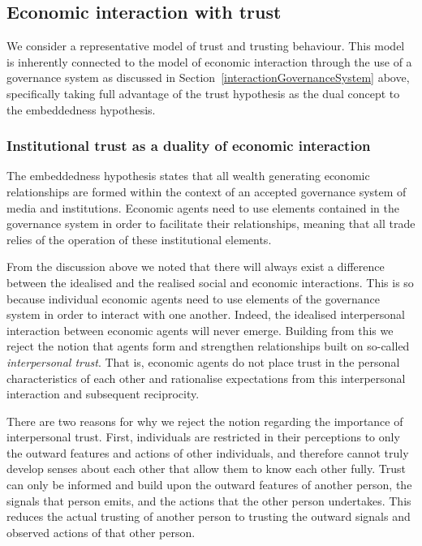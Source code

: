 \begin{subappendices}
\subsection{Economic interaction with trust}

We consider a representative model of trust and trusting behaviour. This model is inherently connected to the model of economic interaction through the use of a governance system as discussed in Section~\ref{interactionGovernanceSystem} above, specifically taking full advantage of the trust hypothesis as the dual concept to the embeddedness hypothesis.

\subsubsection{Institutional trust as a duality of economic interaction}
The embeddedness hypothesis states that all wealth generating economic relationships are formed within the context of an accepted governance system of media and institutions. Economic agents need to use elements contained in the governance system in order to facilitate their relationships, meaning that all trade relies of the operation of these institutional elements.

From the discussion above we noted that there will always exist a difference between the idealised and the realised social and economic interactions. This is so because individual economic agents need to use elements of the governance system in order to interact with one another. Indeed, the idealised interpersonal interaction between economic agents will never emerge. Building from this we reject the notion that agents form and strengthen relationships built on so-called \emph{interpersonal trust}. That is, economic agents do not place trust in the personal characteristics of each other and rationalise expectations from this interpersonal interaction and subsequent reciprocity.

There are two reasons for why we reject the notion regarding the importance of interpersonal trust. First, individuals are restricted in their perceptions to only the outward features and actions of other individuals, and therefore cannot truly develop senses about each other that allow them to know each other fully. Trust can only be informed and build upon the outward features of another person, the signals that person emits, and the actions that the other person undertakes. This reduces the actual trusting of another person to trusting the outward signals and observed actions of that other person.


\end{subappendices}
